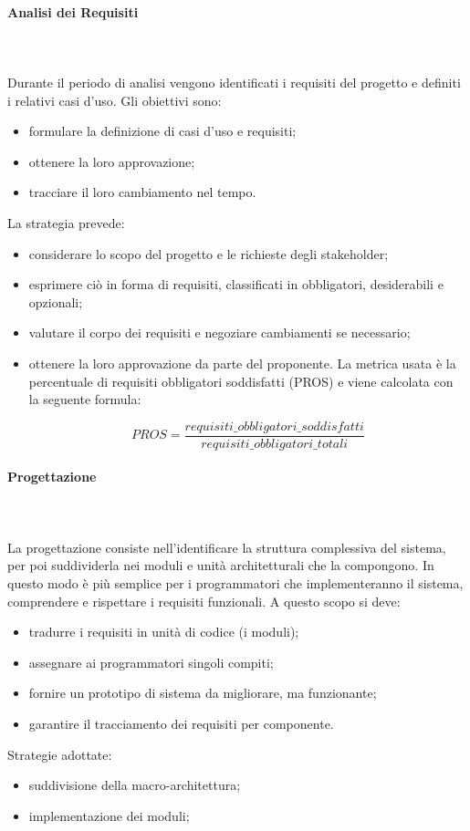 			\paragraph*{Analisi dei Requisiti} \mbox{} \\ \mbox{} \\
			Durante il periodo di analisi vengono identificati i requisiti del progetto e definiti i relativi casi d'uso. 
			Gli obiettivi sono:
			\begin{itemize}
			\item  formulare la definizione di casi d’uso e requisiti;
			\item ottenere la loro approvazione;
			\item tracciare il loro cambiamento nel tempo.
			\end{itemize}
			La strategia prevede:
			\begin{itemize}
			\item considerare lo scopo del progetto e le richieste degli stakeholder;
			\item esprimere ciò in forma di requisiti, classificati in obbligatori, desiderabili e opzionali;
			\item valutare il corpo dei requisiti e negoziare cambiamenti se necessario;
			\item ottenere la loro approvazione da parte del proponente.
			La metrica usata è la percentuale di requisiti obbligatori soddisfatti (PROS) e viene
calcolata con la seguente formula: 

		\[ PROS = \frac{requisiti\_obbligatori\_soddisfatti}{requisiti\_obbligatori\_totali} \]
	
			\end{itemize}
			\paragraph{Progettazione} \mbox{} \\ \mbox{} \\
			La progettazione consiste nell'identificare la struttura complessiva del sistema, per poi suddividerla nei moduli e unità architetturali che la compongono. In questo modo è più semplice per i programmatori che implementeranno il sistema, comprendere e rispettare i requisiti funzionali.
			A questo scopo si deve:
			\begin{itemize}
			\item tradurre i requisiti in unità di codice (i moduli);
			\item assegnare ai programmatori singoli compiti;
			\item fornire un prototipo di sistema da migliorare, ma funzionante;
			\item garantire il tracciamento dei requisiti per componente.
			\end{itemize}
			Strategie adottate:
			\begin{itemize}			
			\item suddivisione della macro-architettura;
			\item implementazione dei moduli;
			\end{itemize}
